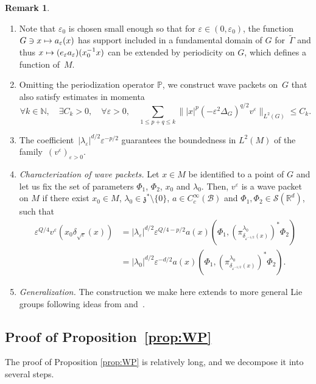 \documentclass[JEP,XML,SOM,Unicode,published]{cedram}
\let\mathcal\mathscr
\newcommand\mto{\mathchoice{\longmapsto}{\mapsto}{\mapsto}{\mapsto}}
\theoremstyle{plain}
\theoremstyle{definition}
\newtheorem{remark}[theorem]{Remark}
\let\eps\varepsilon
\def\R{{\mathbb R}}
\def\N{{\mathbb N}}
\def\bbP{{\mathbb P}}
\begin{document}
\skpt
\begin{remark}\label{rem:toto}
\begin{enumerate}
\item Note that $\eps_0$ is chosen small enough so that for $\eps\in(0,\eps_0)$, the function \hbox{$G\ni x\mto a_\eps(x)$} has support included in a fundamental domain of $G$ for~$\widetilde{\Gamma}$ and thus $x\mto (e_\eps a_\eps)(x_0^{-1}x)$ can be extended by periodicity on $G$, which defines a function of~$M$.
\item Omitting the periodization operator $\bbP$, we construct wave packets on~$G$ that also satisfy estimates in momenta
\[
\forall k\in\N,\quad \exists C_k>0,\quad \forall \eps>0,\quad \sum_{1\leq p+q\leq k} \| |x|^p (-\eps^2\Delta_G)^{q/2} v^\eps\|_{L^2(G)}\leq C_k.
\]
\item The coefficient~$|\lambda_\eps|^{d/2}\eps^{-p/2}$ guarantees the boundedness in $L^2(M)$ of the family~$(v^\eps)_{\eps>0}$.
\item \emph{Characterization of wave packets.} Let
$x\in M$ be identified to a point of $G$ and let us fix the set of parameters $\Phi_1$, $\Phi_2$, $x_0$ and $\lambda_0$. Then, $v^\eps$ is a wave packet on $M$ if there exist $x_0\in M$, $\lambda_0\in\mathfrak z^*\setminus\{0\}$, $a\in C_c^\infty(\mathcal B)$ and $\Phi_1,\Phi_2\in \mathcal S(\R^d)$, such that
\begin{equation}\label{e:carac}
\begin{aligned}
\eps^{Q/4} v^\eps(x_0\delta_{\sqrt\eps} (x)) & =|\lambda_\eps| ^{d/2} \eps^{Q/4-p/2}a(x) (\Phi_1, (\pi^{\lambda_0} _{\delta_{\eps^{-1/2} }(x)})^*\Phi_2)\\
&= |\lambda_0|^{d/2} \eps^{-d/2}a(x) (\Phi_1, (\pi^{\lambda_0} _{\delta_{\eps^{-1/2} }(x)})^*\Phi_2).
\end{aligned}
\end{equation}
\item \emph{Generalization.} The construction we make here extends to more general Lie groups following ideas from \cite[\S6.4]{FF1} and~\cite{pedersen}.
\end{enumerate}
\end{remark}

\subsection{Proof of Proposition~\ref{prop:WP}} The proof of Proposition \ref{prop:WP} is relatively long, and we decompose it into several steps.
\end{document}
